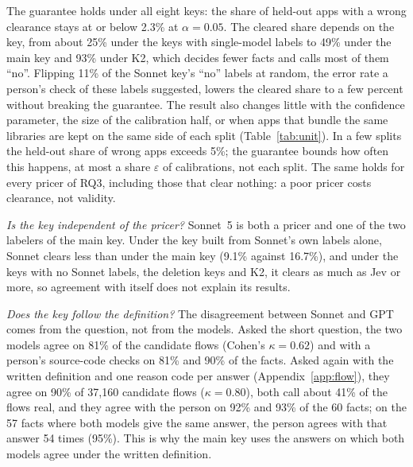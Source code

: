 The guarantee holds under all eight keys: the share of held-out apps with a wrong clearance stays at or below 2.3\% at $\alpha=0.05$.
The cleared share depends on the key, from about 25\% under the keys with single-model labels to 49\% under the main key and 93\% under K2, which decides fewer facts and calls most of them ``no''.
Flipping 11\% of the Sonnet key's ``no'' labels at random, the error rate a person's check of these labels suggested, lowers the cleared share to a few percent without breaking the guarantee.
The result also changes little with the confidence parameter, the size of the calibration half, or when apps that bundle the same libraries are kept on the same side of each split (Table~\ref{tab:unit}).
In a few splits the held-out share of wrong apps exceeds 5\%; the guarantee bounds how often this happens, at most a share $\varepsilon$ of calibrations, not each split.
The same holds for every pricer of RQ3, including those that clear nothing: a poor pricer costs clearance, not validity.

\emph{Is the key independent of the pricer?}
Sonnet~5 is both a pricer and one of the two labelers of the main key.
Under the key built from Sonnet's own labels alone, Sonnet clears less than under the main key (9.1\% against 16.7\%), and under the keys with no Sonnet labels, the deletion keys and K2, it clears as much as Jev or more, so agreement with itself does not explain its results.

\emph{Does the key follow the definition?}
The disagreement between Sonnet and GPT comes from the question, not from the models.
Asked the short question, the two models agree on 81\% of the candidate flows (Cohen's $\kappa=0.62$) and with a person's source-code checks on 81\% and 90\% of the facts.
Asked again with the written definition and one reason code per answer (Appendix~\ref{app:flow}), they agree on 90\% of 37{,}160 candidate flows ($\kappa=0.80$), both call about 41\% of the flows real, and they agree with the person on 92\% and 93\% of the 60 facts; on the 57 facts where both models give the same answer, the person agrees with that answer 54 times (95\%).
This is why the main key uses the answers on which both models agree under the written definition.


